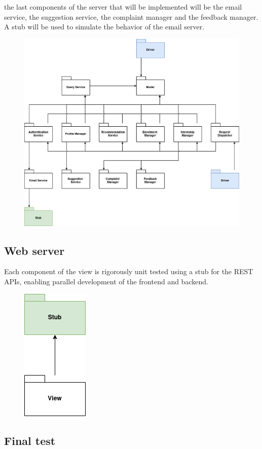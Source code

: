 the last components of the server that will be implemented will be the email service, the suggestion service, the complaint manager and the feedback manager.
A stub will be used to simulate the behavior of the email server.

\begin{figure}[H]
    \centering
    \includegraphics[width=0.8\linewidth]{../assets/implementation-plan-diagrams/implementation-plan-4.png}
\end{figure}

\subsection{Web server}

Each component of the view is rigorously unit tested using a stub for the REST APIs, enabling parallel development of the frontend and backend.

\begin{figure}[H]
    \centering
    \includegraphics[width=0.1\linewidth]{../assets/implementation-plan-diagrams/implementation-plan-5.png}
\end{figure}

\subsection{Final test}

